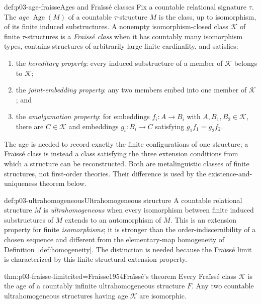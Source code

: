 \begin{hbdefinition}{def:p03-age-fraisse}{Ages and Fra\"iss\'e classes}
Fix a countable relational signature \(\tau\).  The \emph{age}
\(\operatorname{Age}(M)\) of a countable \(\tau\)-structure \(M\) is the
class, up to isomorphism, of its finite induced substructures.  A nonempty
isomorphism-closed class \(\mathcal K\) of finite \(\tau\)-structures is a
\emph{Fra\"iss\'e class} when it has countably many isomorphism types,
contains structures of arbitrarily large finite cardinality, and satisfies:
\begin{enumerate}
  \item the \emph{hereditary property}: every induced substructure of a
        member of \(\mathcal K\) belongs to \(\mathcal K\);
  \item the \emph{joint-embedding property}: any two members embed into one
        member of \(\mathcal K\); and
  \item the \emph{amalgamation property}: for embeddings
        \(f_i:A\to B_i\) with \(A,B_1,B_2\in\mathcal K\), there are
        \(C\in\mathcal K\) and embeddings \(g_i:B_i\to C\) satisfying
        \(g_1f_1=g_2f_2\).
\end{enumerate}
The age is needed to record exactly the finite configurations of one
structure; a Fra\"iss\'e class is instead a class satisfying the three
extension conditions from which a structure can be reconstructed.  Both are
metalinguistic classes of finite structures, not first-order theories.  Their
difference is used by the existence-and-uniqueness theorem below.
\end{hbdefinition}

\begin{hbdefinition}{def:p03-ultrahomogeneous}{Ultrahomogeneous structure}
A countable relational structure \(M\) is \emph{ultrahomogeneous} when every
isomorphism between finite induced substructures of \(M\) extends to an
automorphism of \(M\).  This is an extension property for finite
\emph{isomorphisms}; it is stronger than the order-indiscernibility of a
chosen sequence and different from the elementary-map homogeneity of
Definition~\ref{def:homogeneity}.  The distinction is needed because the
Fra\"iss\'e limit is characterized by this finite structural extension
property.
\end{hbdefinition}

\begin{hbtheorem}{thm:p03-fraisse-limit}{cited=Fraisse1954}{Fra\"iss\'e's theorem}
Every Fra\"iss\'e class \(\mathcal K\) is the age of a countably infinite
ultrahomogeneous structure \(F\).  Any two countable ultrahomogeneous
structures having age \(\mathcal K\) are isomorphic.
\end{hbtheorem}


